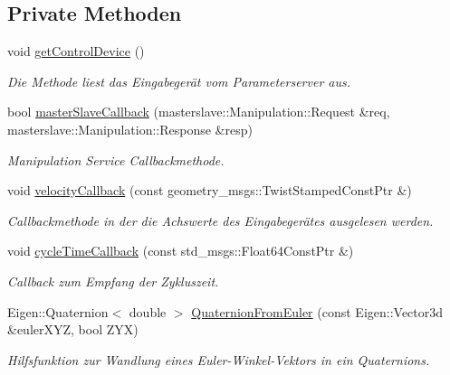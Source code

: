 \subsection*{Private Methoden}
\begin{DoxyCompactItemize}
\item 
\hypertarget{classMasterSlaveManipulation_a65c146773e36828ea63e177e8d03017e}{void \hyperlink{classMasterSlaveManipulation_a65c146773e36828ea63e177e8d03017e}{get\-Control\-Device} ()}\label{classMasterSlaveManipulation_a65c146773e36828ea63e177e8d03017e}

\begin{DoxyCompactList}\small\item\em Die Methode liest das Eingabegerät vom Parameterserver aus. \end{DoxyCompactList}\item 
bool \hyperlink{classMasterSlaveManipulation_a142d1ec4b3126540a6bce1998452d0af}{master\-Slave\-Callback} (masterslave\-::\-Manipulation\-::\-Request \&req, masterslave\-::\-Manipulation\-::\-Response \&resp)
\begin{DoxyCompactList}\small\item\em Manipulation Service Callbackmethode. \end{DoxyCompactList}\item 
\hypertarget{classMasterSlaveManipulation_adfd18bc0bb7cdd93586aca7aaea2c696}{void \hyperlink{classMasterSlaveManipulation_adfd18bc0bb7cdd93586aca7aaea2c696}{velocity\-Callback} (const geometry\-\_\-msgs\-::\-Twist\-Stamped\-Const\-Ptr \&)}\label{classMasterSlaveManipulation_adfd18bc0bb7cdd93586aca7aaea2c696}

\begin{DoxyCompactList}\small\item\em Callbackmethode in der die Achswerte des Eingabegerätes ausgelesen werden. \end{DoxyCompactList}\item 
\hypertarget{classMasterSlaveManipulation_a3030f547b0e41511315948b020912230}{void \hyperlink{classMasterSlaveManipulation_a3030f547b0e41511315948b020912230}{cycle\-Time\-Callback} (const std\-\_\-msgs\-::\-Float64\-Const\-Ptr \&)}\label{classMasterSlaveManipulation_a3030f547b0e41511315948b020912230}

\begin{DoxyCompactList}\small\item\em Callback zum Empfang der Zykluszeit. \end{DoxyCompactList}\item 
Eigen\-::\-Quaternion$<$ double $>$ \hyperlink{classMasterSlaveManipulation_a09a4d65773ae287f0bf16bb0d8b26791}{Quaternion\-From\-Euler} (const Eigen\-::\-Vector3d \&euler\-X\-Y\-Z, bool Z\-Y\-X)
\begin{DoxyCompactList}\small\item\em Hilfsfunktion zur Wandlung eines Euler-\/\-Winkel-\/\-Vektors in ein Quaternions. \end{DoxyCompactList}\end{DoxyCompactItemize}
